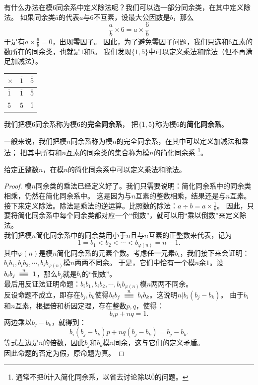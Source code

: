 \documentclass[12pt,UTF8,fontset=none]{ctexbook}
\begin{document}
有什么办法在模$6$同余系中定义除法呢？我们可以选一部分同余类，在其中定义除法。
如果同余类$\overline{a}$的代表$a$与$6$不互素，设最大公因数是$b$，那么
$$ \frac{a}{b} \times 6 = a \times \frac{6}{b} $$
于是有$\overline{a} \times \overline{\frac{6}{b}} = \overline{0}$，出现零因子。
因此，为了避免零因子问题，我们只选和$6$互素的数所在的同余类，也就是$\overline{1}$和$\overline{5}$。
我们发现$\{\overline{1}, \overline{5}\}$中可以定义乘法和除法（但不再满足加减法）。
\begin{center}
    \begin{tabular}{ | p{2em}<{\centering} | p{2em}<{\centering} | p{2em}<{\centering} | }
        \hline
            $\times$   & $\overline{1}$ & $\overline{5}$ \\ [0.5ex] 
        \hline
        $\overline{1}$ & $\overline{1}$ & $\overline{5}$ \\
        \hline
        $\overline{5}$ & $\overline{5}$ & $\overline{1}$ \\
        \hline
    \end{tabular}
\end{center}
我们把模$6$同余系称为模$6$的\textbf{完全同余系}，
把$\{\overline{1}, \overline{5}\}$称为模$6$的\textbf{简化同余系}。

一般来说，我们把模$n$同余系称为模$n$的完全同余系，在其中可以定义加减法和乘法；
把其中所有和$n$互素的同余类的集合称为模$n$的简化同余系
\footnote{通常不把$\overline{0}$计入简化同余系，以省去讨论除以$\overline{0}$的问题。}。

\begin{tm}\label{tm:3-2-0}
    给定正整数$n$，在模$n$的简化同余系中可以定义乘法和除法。
\end{tm}
\begin{proof}
    模$n$同余类的乘法已经定义好了。我们只需要说明：简化同余系中的同余类相乘，仍然在简化同余系中。
    这是因为与$n$互素的整数相乘，结果还是与$n$互素。\\
    接下来定义除法。除法是乘法的逆运算。比照数的除法：$a \div b = a \times \frac{1}{b}$。
    因此，只要将简化同余系中每个同余类都对应一个“倒数”，就可以用“乘以倒数”来定义除法。\\
    我们把模$n$简化同余系中的同余类用小于$n$且与$n$互素的正整数来代表，记为
    $$1 = b_1 < b_2 < \cdots < b_{\varphi(n)} = n-1.$$
    其中$\varphi(n)$是模$n$简化同余系的元素个数。考虑任一元素$b_i$，我们接下来会证明：
    $b_ib_1, b_ib_2, \cdots, b_ib_{\varphi(n)}$模$n$两两不同余。
    于是，它们中恰有一个模$n$余$1$。设$b_ib_j \tong{n} 1$，那么$b_j$就是$b_i$的“倒数”。\\
    最后用反证法证明命题：$b_ib_1, b_ib_2, \cdots, b_ib_{\varphi(n)}$模$n$两两不同余。\\
    反设命题不成立，即存在$b_j, b_k$使得$b_ib_j \tong{n} b_ib_k$。这说明$n | b_i(b_j - b_k)$。
    由于$b_i$和$n$互素，根据倍和析因定理，存在整数$p, q$，使得：
    $$ b_ip + nq = 1.$$
    两边乘以$b_j - b_k$，就得到：
    $$ b_i(b_j - b_k)p + nq(b_j - b_k) = b_j - b_k.$$
    等式左边是$n$的倍数，因此$b_j$和$b_k$模$n$同余，这与它们的定义矛盾。\\
    因此命题的否定为假，原命题为真。
\end{proof}
\end{document}
